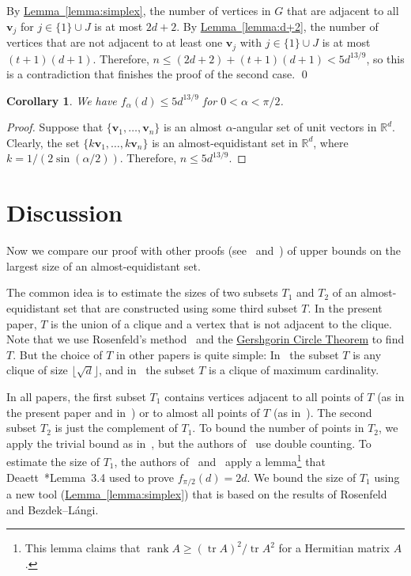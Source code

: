 \documentclass[a4paper, oneside, reqno, 12pt]{amsart}
\theoremstyle{plain}
\newtheorem{corollary}[theorem]{Corollary}
\theoremstyle{definition}
\DeclareMathOperator{\tr}{tr}
\DeclareMathOperator{\rank}{rank}
\begin{document}
By \hyperref[lemma:simplex]{Lemma~\ref*{lemma:simplex}}, the number of vertices in $G$ that are adjacent to all $\mathbf v_j$ for $j\in \{1\}\cup J$ is at most $2d+2$. By \hyperref[lemma:d+2]{Lemma~\ref*{lemma:d+2}}, the number of vertices that are not adjacent to at least one $\mathbf v_j$ with $j\in\{1\}\cup J$ is at most $(t+1)(d+1)$. Therefore, $n\leq (2d+2)+(t+1)(d+1)< 5d^{13/9}$, so this is a contradiction that finishes the proof of the second case.
\qed

\begin{corollary}\label{corollary:alpha} We have
	$f_{\alpha}(d)\leq 5d^{13/9}$ for $0<\alpha<\pi/2$.
\end{corollary}
\begin{proof}
Suppose that $\{\mathbf v_1, \dots, \mathbf v_n\}$ is an almost $\alpha$-angular set of unit vectors in $\mathbb R^d$. Clearly, the set $\{k\mathbf v_1, \dots, k\mathbf v_n\}$ is an almost-equidistant set in $\mathbb R^d$, where $k=1/(2\sin (\alpha/2))$. Therefore, $n\leq 5d^{13/9}$.
\end{proof}
\section{Discussion}\label{section:discussion}
Now we compare our proof with other proofs (see~\cite{BPSSV16} and~\cite{KMS17}) of upper bounds on the largest size of an almost-equidistant set.

The common idea is to estimate the sizes of two subsets $T_1$ and $T_2$ of an almost-equidistant set that are constructed using some third subset $T$. In the present paper, $T$ is the union of a clique and a vertex that is not adjacent to the clique. Note that we use Rosenfeld's method~\cite{R90} and the \hyperref[theorem:gershgorin]{Gershgorin Circle Theorem} to find $T$. But the choice of $T$ in other papers is quite simple: In~\cite{BPSSV16} the subset $T$ is any clique of size $\lfloor \sqrt{d}\rfloor$, and in~\cite{KMS17} the subset $T$ is a clique of maximum cardinality. 

In all papers, the first subset $T_1$ contains vertices adjacent to all points of $T$ (as in the present paper and in~\cite{BPSSV16}) or to almost all points of $T$ (as in~\cite{KMS17}). The second subset $T_2$ is just the complement of $T_1$. To bound the number of points in $T_2$, we apply the trivial bound as in~\cite{BPSSV16}, but the authors of~\cite{KMS17} use double counting. To estimate the size of $T_1$, the authors of~\cite{BPSSV16} and~\cite{KMS17} apply a lemma\footnote[1]{This lemma claims that $\rank A\geq (\tr A)^2/\tr A^2$ for a Hermitian matrix $A$.} that Deaett~\cite{D11}*{Lemma~3.4} used to prove $f_{\pi/2}(d)=2d$. We bound the size of $T_1$ using a new tool (\hyperref[lemma:simplex]{Lemma~\ref*{lemma:simplex}}) that is based on the results of Rosenfeld and Bezdek--L\'angi.
\end{document}
